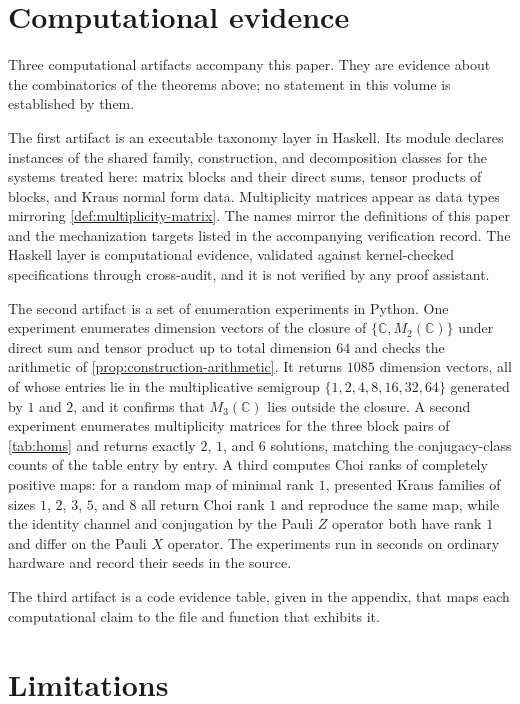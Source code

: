 \documentclass[11pt,letterpaper]{article}
\theoremstyle{definition}
\theoremstyle{remark}
\begin{document}
\section{Computational evidence}
\label{sec:computation}

Three computational artifacts accompany this paper. They are evidence about the combinatorics of the theorems above; no statement in this volume is established by them.

The first artifact is an executable taxonomy layer in Haskell. Its module declares instances of the shared family, construction, and decomposition classes for the systems treated here: matrix blocks and their direct sums, tensor products of blocks, and Kraus normal form data. Multiplicity matrices appear as data types mirroring \cref{def:multiplicity-matrix}. The names mirror the definitions of this paper and the mechanization targets listed in the accompanying verification record. The Haskell layer is computational evidence, validated against kernel-checked specifications through cross-audit, and it is not verified by any proof assistant.

The second artifact is a set of enumeration experiments in Python. One experiment enumerates dimension vectors of the closure of $\{\mathbb{C}, M_2(\mathbb{C})\}$ under direct sum and tensor product up to total dimension $64$ and checks the arithmetic of \cref{prop:construction-arithmetic}. It returns $1085$ dimension vectors, all of whose entries lie in the multiplicative semigroup $\{1, 2, 4, 8, 16, 32, 64\}$ generated by $1$ and $2$, and it confirms that $M_3(\mathbb{C})$ lies outside the closure. A second experiment enumerates multiplicity matrices for the three block pairs of \cref{tab:homs} and returns exactly $2$, $1$, and $6$ solutions, matching the conjugacy-class counts of the table entry by entry. A third computes Choi ranks of completely positive maps: for a random map of minimal rank $1$, presented Kraus families of sizes $1$, $2$, $3$, $5$, and $8$ all return Choi rank $1$ and reproduce the same map, while the identity channel and conjugation by the Pauli $Z$ operator both have rank $1$ and differ on the Pauli $X$ operator. The experiments run in seconds on ordinary hardware and record their seeds in the source.

The third artifact is a code evidence table, given in the appendix, that maps each computational claim to the file and function that exhibits it.

\section{Limitations}
\end{document}
